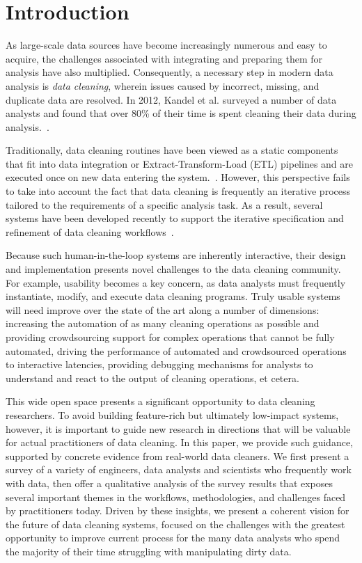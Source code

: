\section{Introduction}
As large-scale data sources have become increasingly numerous and easy to acquire, the challenges associated with integrating and preparing them for analysis have also multiplied.
Consequently, a necessary step in modern data analysis is \textit{data cleaning}, wherein issues caused by incorrect, missing, and duplicate data are resolved.
In 2012, Kandel et al. surveyed a number of data analysts and found that over 80\% of their time is spent cleaning their data during analysis.~\cite{kandel2012}.

Traditionally, data cleaning routines have been viewed as a static components that fit into data integration or Extract-Transform-Load (ETL) pipelines and are executed once on new data entering the system.~\cite{apachefalcon, informatica, talend, nadeef}.
However, this perspective fails to take into account the fact that data cleaning is frequently an iterative process tailored to the requirements of a specific analysis task.
As a result, several systems have been developed recently to support the iterative specification and refinement of data cleaning workflows~\cite{trifacta, 2011-wrangler, openrefine, wisteria}.

Because such human-in-the-loop systems are inherently interactive, their design and implementation presents novel challenges to the data cleaning community.
For example, usability becomes a key concern, as data analysts must frequently instantiate, modify, and execute data cleaning programs.
Truly usable systems will need improve over the state of the art along a number of dimensions: increasing the automation of as many cleaning operations as possible and providing crowdsourcing support for complex operations that cannot be fully automated, driving the performance of automated and crowdsourced operations to interactive latencies, providing debugging mechanisms for analysts to understand and react to the output of cleaning operations, et cetera.

This wide open space presents a significant opportunity to data cleaning researchers.
To avoid building feature-rich but ultimately low-impact systems, however, it is important to guide new research in directions that will be valuable for actual practitioners of data cleaning.
In this paper, we provide such guidance, supported by concrete evidence from real-world data cleaners.
We first present a survey of a variety of engineers, data analysts and scientists who frequently work with data, then offer a qualitative analysis of the survey results that exposes several important themes in the workflows, methodologies, and challenges faced by practitioners today.
Driven by these insights, we present a coherent vision for the future of data cleaning systems, focused on the challenges with the greatest opportunity to improve current process for the many data analysts who spend the majority of their time struggling with manipulating dirty data.

